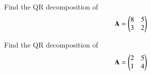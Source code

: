   \item{}\\
  \item{}\\
  \item {}\\
  \item {}\\
  \item {}\\
  \item {}\\
  \item {}\\
  \item {}\\
  \item {}\\
  \item {}\\
  \item {}\\
\item Find the QR decomposition of 
\begin{align}
\mathbf{A}=\begin{pmatrix}8&5\\3&2\end{pmatrix} \label{eq:solutions/decomp/2/29/eq:1}
\end{align}
%
\item Find the QR decomposition of 
\begin{align}
\mathbf{A}=\begin{pmatrix}2&5\\1&4\end{pmatrix} \label{eq:solutions/decomp/2/30/1}
\end{align}

%        

